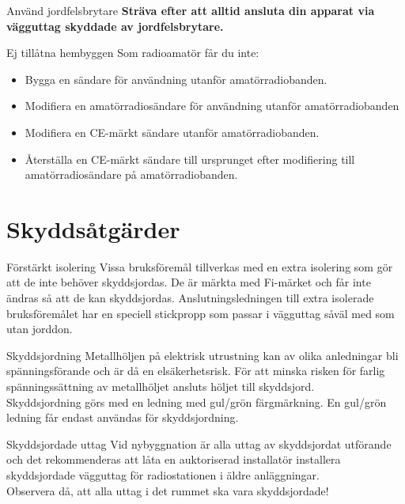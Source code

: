 \documentclass{beamer}
\begin{document}
\begin{frame}{Använd jordfelsbrytare}
\textbf{Sträva efter att alltid ansluta din apparat via vägguttag
	skyddade av jordfelsbrytare.}
\end{frame}

\begin{frame}{Ej tillåtna hembyggen}
Som radioamatör får du inte:
\begin{itemize}
	\item Bygga en sändare för användning utanför amatörradiobanden.
	\item Modifiera en amatörradiosändare för användning utanför amatörradiobanden
	\item Modifiera en CE-märkt sändare utanför amatörradiobanden.
	\item Återställa en CE-märkt sändare till ursprunget efter modifiering till
	amatörradiosändare på amatörradiobanden.
\end{itemize}
\end{frame}

\section{Skyddsåtgärder}

\begin{frame}{Förstärkt isolering}
Vissa bruksföremål tillverkas med en extra isolering som gör att de inte behöver
skyddsjordas.
De är märkta med Fi-märket och får inte ändras så att de kan skyddsjordas.
Anslutningsledningen till extra isolerade bruksföremålet har en speciell
stickpropp som passar i vägguttag såväl med som utan jorddon.
\end{frame}

\begin{frame}{Skyddsjordning}
Metallhöljen på elektrisk utrustning kan av olika anledningar bli
spänningsförande och är då en elsäkerhetsrisk.
För att minska risken för farlig spänningssättning av metallhöljet ansluts
höljet till skyddsjord.\\
\vspace{5mm}
Skyddsjordning görs med en ledning med gul/grön färgmärkning.
En gul/grön ledning får endast användas för skyddsjordning.
\end{frame}

\begin{frame}{Skyddsjordade uttag}
Vid nybyggnation är alla uttag av skyddsjordat utförande och det rekommenderas
att låta en auktoriserad installatör installera skyddsjordade vägguttag för
radiostationen i äldre anläggningar.\\
\vspace{5mm}
Observera då, att alla uttag i det rummet ska vara skyddsjordade!
\end{frame}
\end{document}
